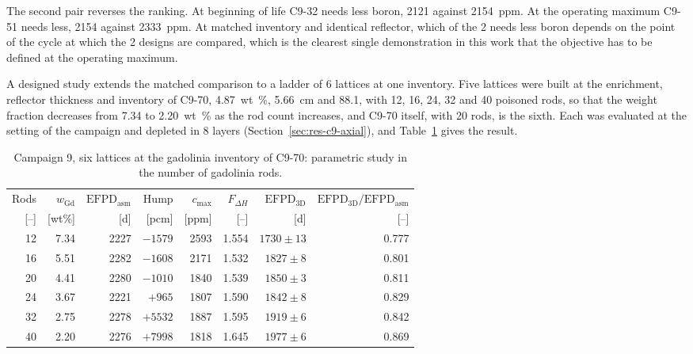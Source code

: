 The second pair reverses the ranking. At beginning of life C9-32 needs less
boron, 2121 against \SI{2154}{ppm}. At the operating maximum C9-51 needs
less, 2154 against \SI{2333}{ppm}. At matched inventory and identical
reflector, which of the 2 needs less boron depends on the point of the cycle at
which the 2 designs are compared, which is the clearest single demonstration in this
work that the objective has to be defined at the operating maximum.

A designed study extends the matched comparison to a ladder of 6
lattices at one inventory. Five lattices were built at the enrichment,
reflector thickness and inventory of C9-70, \SI{4.87}{wt\%},
\SI{5.66}{cm} and 88.1, with 12, 16, 24, 32 and 40 poisoned rods, so
that the weight fraction decreases from 7.34 to \SI{2.20}{wt\%} as the
rod count increases, and C9-70 itself, with 20 rods, is the sixth. Each was
evaluated at the setting of the campaign and depleted in 8 layers
(Section~\ref{sec:res-c9-axial}), and Table~\ref{tab:c9-gdstudy} gives
the result.

\begin{table}[htbp]
  \centering
  \small
  \caption{Campaign 9, six lattices at the gadolinia inventory of C9-70: parametric study in the number of gadolinia rods.}
  \label{tab:c9-gdstudy}
  \begin{tabular}{@{}rrrrrrrr@{}}
    \toprule
    Rods & $w_\mathrm{Gd}$ & $\mathrm{EFPD}_\mathrm{asm}$ & Hump & $c_\mathrm{max}$ & $F_{\Delta H}$ & $\mathrm{EFPD}_\mathrm{3D}$ & $\mathrm{EFPD}_\mathrm{3D}/\mathrm{EFPD}_\mathrm{asm}$ \\
    {[--]} & [wt\%] & [d] & [pcm] & [ppm] & [--] & [d] & [--] \\
    \midrule
    12 & 7.34 & 2227 & $-1579$ & 2593 & 1.554 & $1730 \pm 13$ & 0.777 \\
    16 & 5.51 & 2282 & $-1608$ & 2171 & 1.532 & $1827 \pm 8$  & 0.801 \\
    20 & 4.41 & 2280 & $-1010$ & 1840 & 1.539 & $1850 \pm 3$  & 0.811 \\
    24 & 3.67 & 2221 & $+965$  & 1807 & 1.590 & $1842 \pm 8$  & 0.829 \\
    32 & 2.75 & 2278 & $+5532$ & 1887 & 1.595 & $1919 \pm 6$  & 0.842 \\
    40 & 2.20 & 2276 & $+7998$ & 1818 & 1.645 & $1977 \pm 6$  & 0.869 \\
    \bottomrule
  \end{tabular}
\end{table}

